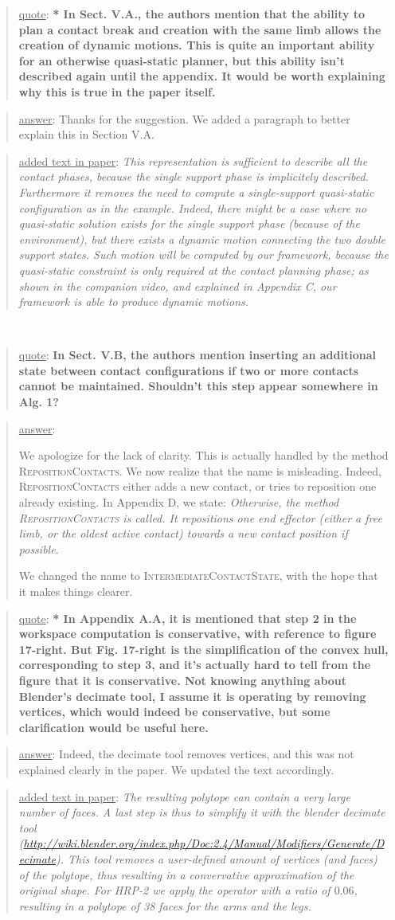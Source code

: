 \documentclass[a4paper]{article}
\newcommand{\done}[0]{}
\newcommand\quot[1]{\begin{quote} \underline{quote}: \textbf{#1}\end{quote}}
\newcommand\as[1]{\begin{quote} \underline{answer}: {#1}\end{quote} }
\newcommand\qt[1]{\begin{quote} \underline{added text in paper}: \textit{#1}\end{quote} \leavevmode \\ }
\begin{document}
\quot{* In Sect. V.A., the authors mention that the ability to plan a contact
break and creation with the same limb allows the creation of dynamic
motions. This is quite an important ability for an otherwise
quasi-static planner, but this ability isn't described again until the
appendix. It would be worth explaining why this is true in the paper
itself. }
\as{Thanks for the suggestion. We added a paragraph to better explain this in Section V.A.}
\qt{This representation is sufficient to describe all the contact phases, because the single support phase is implicitely described. Furthermore it removes the need to compute a single-support quasi-static configuration as in the example. Indeed, there might be a case where no quasi-static solution exists for the single support phase (because of the environment), but
there exists a dynamic motion connecting the two double support states. Such motion will be computed by our framework, because the quasi-static constraint is only required at the contact planning phase; as shown in the companion video, and explained in Appendix C, our framework is able to produce dynamic motions.
}
\done

\quot{In Sect. V.B, the authors mention inserting an additional state
between contact configurations if two or more contacts cannot be
maintained. Shouldn't this step appear somewhere in Alg. 1?}
\as{We apologize for the lack of clarity. This is actually handled by the method \textsc{RepositionContacts}. We now realize that the name is misleading. Indeed,
\textsc{RepositionContacts} either adds a new contact, or tries to reposition one already existing. In Appendix D, we state:
\textit{Otherwise, the method \textsc{RepositionContacts} is called. It repositions one end effector (either a free
limb, or the oldest active contact) towards a new contact
position if possible. }

We changed the name to \textsc{IntermediateContactState}, with the hope that it makes things clearer.}\done

\quot{* In Appendix A.A, it is mentioned that step 2 in the workspace
computation is conservative, with reference to figure 17-right. But
Fig. 17-right is the simplification of the convex hull, corresponding
to step 3, and it's actually hard to tell from the figure that it is
conservative. Not knowing anything about Blender's decimate tool, I
assume it is operating by removing vertices, which would indeed be
conservative, but some clarification would be useful here.}
\as{Indeed, the decimate tool removes vertices, and this was not explained clearly in the paper. We updated the text accordingly.}
\qt{The resulting polytope can contain a very large number of faces. A last step is thus to simplify it with the blender decimate tool (\url{http://wiki.blender.org/index.php/Doc:2.4/Manual/Modifiers/Generate/Decimate}). This tool removes a user-defined amount of vertices (and faces) of the polytope, thus resulting
in a convervative approximation of the original shape. For HRP-2 we apply the operator with a ratio of $0.06$, resulting in a polytope of 38 faces for the arms and the legs.}\done
\end{document}
